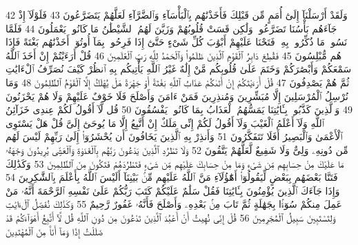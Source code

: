{\tiny\colorbox{cl_aya}{42}} وَلَقَدْ أَرْسَلْنَآ إِلَىٰٓ أُمَمٍ مِّن قَبْلِكَ فَأَخَذْنَٰهُم بِٱلْبَأْسَآءِ وَٱلضَّرَّآءِ لَعَلَّهُمْ يَتَضَرَّعُونَ
{\tiny\colorbox{cl_aya}{43}} فَلَوْلَآ إِذْ جَآءَهُم بَأْسُنَا تَضَرَّعُوا۟ وَلَٰكِن قَسَتْ قُلُوبُهُمْ وَزَيَّنَ لَهُمُ ٱلشَّيْطَٰنُ مَا كَانُوا۟ يَعْمَلُونَ
{\tiny\colorbox{cl_aya}{44}} فَلَمَّا نَسُوا۟ مَا ذُكِّرُوا۟ بِهِۦ فَتَحْنَا عَلَيْهِمْ أَبْوَٰبَ كُلِّ شَىْءٍ حَتَّىٰٓ إِذَا فَرِحُوا۟ بِمَآ أُوتُوٓا۟ أَخَذْنَٰهُم بَغْتَةً فَإِذَا هُم مُّبْلِسُونَ
{\tiny\colorbox{cl_aya}{45}} فَقُطِعَ دَابِرُ ٱلْقَوْمِ ٱلَّذِينَ ظَلَمُوا۟ وَٱلْحَمْدُ لِلَّهِ رَبِّ ٱلْعَٰلَمِينَ
{\tiny\colorbox{cl_aya}{46}} قُلْ أَرَءَيْتُمْ إِنْ أَخَذَ ٱللَّهُ سَمْعَكُمْ وَأَبْصَٰرَكُمْ وَخَتَمَ عَلَىٰ قُلُوبِكُم مَّنْ إِلَٰهٌ غَيْرُ ٱللَّهِ يَأْتِيكُم بِهِ ٱنظُرْ كَيْفَ نُصَرِّفُ ٱلْءَايَٰتِ ثُمَّ هُمْ يَصْدِفُونَ
{\tiny\colorbox{cl_aya}{47}} قُلْ أَرَءَيْتَكُمْ إِنْ أَتَىٰكُمْ عَذَابُ ٱللَّهِ بَغْتَةً أَوْ جَهْرَةً هَلْ يُهْلَكُ إِلَّا ٱلْقَوْمُ ٱلظَّٰلِمُونَ
{\tiny\colorbox{cl_aya}{48}} وَمَا نُرْسِلُ ٱلْمُرْسَلِينَ إِلَّا مُبَشِّرِينَ وَمُنذِرِينَ فَمَنْ ءَامَنَ وَأَصْلَحَ فَلَا خَوْفٌ عَلَيْهِمْ وَلَا هُمْ يَحْزَنُونَ
{\tiny\colorbox{cl_aya}{49}} وَٱلَّذِينَ كَذَّبُوا۟ بِـَٔايَٰتِنَا يَمَسُّهُمُ ٱلْعَذَابُ بِمَا كَانُوا۟ يَفْسُقُونَ
{\tiny\colorbox{cl_aya}{50}} قُل لَّآ أَقُولُ لَكُمْ عِندِى خَزَآئِنُ ٱللَّهِ وَلَآ أَعْلَمُ ٱلْغَيْبَ وَلَآ أَقُولُ لَكُمْ إِنِّى مَلَكٌ إِنْ أَتَّبِعُ إِلَّا مَا يُوحَىٰٓ إِلَىَّ قُلْ هَلْ يَسْتَوِى ٱلْأَعْمَىٰ وَٱلْبَصِيرُ أَفَلَا تَتَفَكَّرُونَ
{\tiny\colorbox{cl_aya}{51}} وَأَنذِرْ بِهِ ٱلَّذِينَ يَخَافُونَ أَن يُحْشَرُوٓا۟ إِلَىٰ رَبِّهِمْ لَيْسَ لَهُم مِّن دُونِهِۦ وَلِىٌّ وَلَا شَفِيعٌ لَّعَلَّهُمْ يَتَّقُونَ
{\tiny\colorbox{cl_aya}{52}} وَلَا تَطْرُدِ ٱلَّذِينَ يَدْعُونَ رَبَّهُم بِٱلْغَدَوٰةِ وَٱلْعَشِىِّ يُرِيدُونَ وَجْهَهُۥ مَا عَلَيْكَ مِنْ حِسَابِهِم مِّن شَىْءٍ وَمَا مِنْ حِسَابِكَ عَلَيْهِم مِّن شَىْءٍ فَتَطْرُدَهُمْ فَتَكُونَ مِنَ ٱلظَّٰلِمِينَ
{\tiny\colorbox{cl_aya}{53}} وَكَذَٰلِكَ فَتَنَّا بَعْضَهُم بِبَعْضٍ لِّيَقُولُوٓا۟ أَهَٰٓؤُلَآءِ مَنَّ ٱللَّهُ عَلَيْهِم مِّنۢ بَيْنِنَآ أَلَيْسَ ٱللَّهُ بِأَعْلَمَ بِٱلشَّٰكِرِينَ
{\tiny\colorbox{cl_aya}{54}} وَإِذَا جَآءَكَ ٱلَّذِينَ يُؤْمِنُونَ بِـَٔايَٰتِنَا فَقُلْ سَلَٰمٌ عَلَيْكُمْ كَتَبَ رَبُّكُمْ عَلَىٰ نَفْسِهِ ٱلرَّحْمَةَ أَنَّهُۥ مَنْ عَمِلَ مِنكُمْ سُوٓءًۢا بِجَهَٰلَةٍ ثُمَّ تَابَ مِنۢ بَعْدِهِۦ وَأَصْلَحَ فَأَنَّهُۥ غَفُورٌ رَّحِيمٌ
{\tiny\colorbox{cl_aya}{55}} وَكَذَٰلِكَ نُفَصِّلُ ٱلْءَايَٰتِ وَلِتَسْتَبِينَ سَبِيلُ ٱلْمُجْرِمِينَ
{\tiny\colorbox{cl_aya}{56}} قُلْ إِنِّى نُهِيتُ أَنْ أَعْبُدَ ٱلَّذِينَ تَدْعُونَ مِن دُونِ ٱللَّهِ قُل لَّآ أَتَّبِعُ أَهْوَآءَكُمْ قَدْ ضَلَلْتُ إِذًا وَمَآ أَنَا۠ مِنَ ٱلْمُهْتَدِينَ

